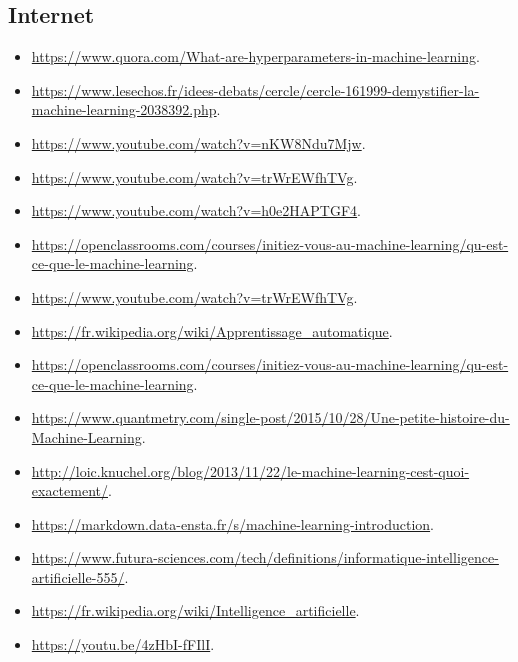 \documentclass[12pt,titlepage]{article}
\begin{document}
\subsection{Internet}
\begin{itemize}

\sloppy
\item \url{https://www.quora.com/What-are-hyperparameters-in-machine-learning}.
\item \url{https://www.lesechos.fr/idees-debats/cercle/cercle-161999-demystifier-la-machine-learning-2038392.php}.
\item \url{https://www.youtube.com/watch?v=nKW8Ndu7Mjw}.
\item \url{https://www.youtube.com/watch?v=trWrEWfhTVg}.
\item \url{https://www.youtube.com/watch?v=h0e2HAPTGF4}.
\item \url{https://openclassrooms.com/courses/initiez-vous-au-machine-learning/qu-est-ce-que-le-machine-learning}.
\item \url{https://www.youtube.com/watch?v=trWrEWfhTVg}.
\item \url{https://fr.wikipedia.org/wiki/Apprentissage_automatique}.
\item \url{https://openclassrooms.com/courses/initiez-vous-au-machine-learning/qu-est-ce-que-le-machine-learning}.
\item \url{https://www.quantmetry.com/single-post/2015/10/28/Une-petite-histoire-du-Machine-Learning}.
\item \url{http://loic.knuchel.org/blog/2013/11/22/le-machine-learning-cest-quoi-exactement/}.
\item \url{https://markdown.data-ensta.fr/s/machine-learning-introduction}.
\item \url{https://www.futura-sciences.com/tech/definitions/informatique-intelligence-artificielle-555/}.
\item \url{https://fr.wikipedia.org/wiki/Intelligence_artificielle}.
\item \url{https://youtu.be/4zHbI-fFIlI}.

\end{itemize}
\end{document}
